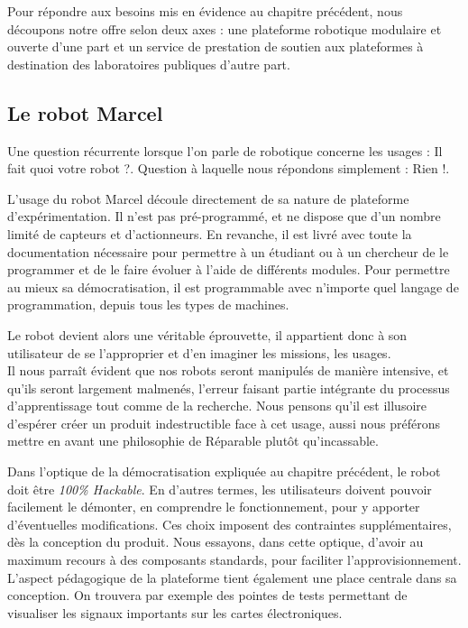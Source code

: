 \documentclass[a4paper,12pt]{report}
\begin{document}
Pour répondre aux besoins mis en évidence au chapitre précédent, nous découpons notre offre selon deux axes :
une plateforme robotique modulaire et ouverte d'une part et un service de prestation de soutien aux plateformes à destination des laboratoires publiques d'autre part.
\subsection{Le robot Marcel}
Une question récurrente lorsque l'on parle de robotique concerne les usages : \og{}Il fait quoi votre robot ?\fg{}.
Question à laquelle nous répondons simplement : \og{}Rien !\fg{}.

L'usage du robot Marcel découle directement de sa nature de plateforme d'expérimentation.
Il n'est pas pré-programmé, et ne dispose que d'un nombre limité de capteurs et d'actionneurs.
En revanche, il est livré avec toute la documentation nécessaire pour permettre à un étudiant ou à un chercheur de le programmer et de le faire évoluer à l'aide de différents modules.
Pour permettre au mieux sa démocratisation, il est programmable avec n'importe quel langage de programmation, depuis tous les types de machines.

Le robot devient alors une véritable éprouvette, il appartient donc à son utilisateur de se l'approprier et d'en imaginer les missions, les usages.\\

Il nous parraît évident que nos robots seront manipulés de manière intensive, et qu'ils seront largement malmenés, 
l'erreur faisant partie intégrante du processus d'apprentissage tout comme de la recherche.
Nous pensons qu'il est illusoire d'espérer créer un produit indestructible face à cet usage, aussi nous préférons mettre en avant une philosophie de \og{}Réparable plutôt qu'incassable\fg{}.

Dans l'optique de la démocratisation expliquée au chapitre précédent, le robot doit être \emph{100\% Hackable}.
En d'autres termes, les utilisateurs doivent pouvoir facilement le démonter, en comprendre le fonctionnement, pour y apporter d'éventuelles modifications.
Ces choix imposent des contraintes supplémentaires, dès la conception du produit.
Nous essayons, dans cette optique, d'avoir au maximum recours à des composants standards, pour faciliter l'approvisionnement.
L'aspect pédagogique de la plateforme tient également une place centrale dans sa conception.
On trouvera par exemple des pointes de tests permettant de visualiser les signaux importants sur les cartes électroniques.\\
\end{document}
